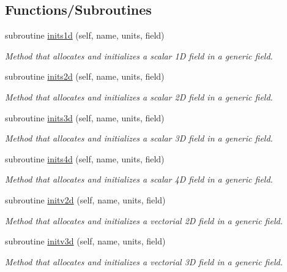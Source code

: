 \subsection*{Functions/\+Subroutines}
\begin{DoxyCompactItemize}
\item 
subroutine \mbox{\hyperlink{namespacefield__types__mod_ae4985a4f37aad76b5bd9d4fdbdec8ff3}{inits1d}} (self, name, units, field)
\begin{DoxyCompactList}\small\item\em Method that allocates and initializes a scalar 1D field in a generic field. \end{DoxyCompactList}\item 
subroutine \mbox{\hyperlink{namespacefield__types__mod_a55a57c6fa8c785a5f529ca577a677845}{inits2d}} (self, name, units, field)
\begin{DoxyCompactList}\small\item\em Method that allocates and initializes a scalar 2D field in a generic field. \end{DoxyCompactList}\item 
subroutine \mbox{\hyperlink{namespacefield__types__mod_ac3c3c9514102272c69299be06deabbcd}{inits3d}} (self, name, units, field)
\begin{DoxyCompactList}\small\item\em Method that allocates and initializes a scalar 3D field in a generic field. \end{DoxyCompactList}\item 
subroutine \mbox{\hyperlink{namespacefield__types__mod_a0499b29bbd4e4628fe73678cf554d918}{inits4d}} (self, name, units, field)
\begin{DoxyCompactList}\small\item\em Method that allocates and initializes a scalar 4D field in a generic field. \end{DoxyCompactList}\item 
subroutine \mbox{\hyperlink{namespacefield__types__mod_a26cb1df2a85bf21d45693942957c9dae}{initv2d}} (self, name, units, field)
\begin{DoxyCompactList}\small\item\em Method that allocates and initializes a vectorial 2D field in a generic field. \end{DoxyCompactList}\item 
subroutine \mbox{\hyperlink{namespacefield__types__mod_ae163912444021fda00f4d821d4c85721}{initv3d}} (self, name, units, field)
\begin{DoxyCompactList}\small\item\em Method that allocates and initializes a vectorial 3D field in a generic field. \end{DoxyCompactList}\item 

\end{DoxyCompactItemize}

